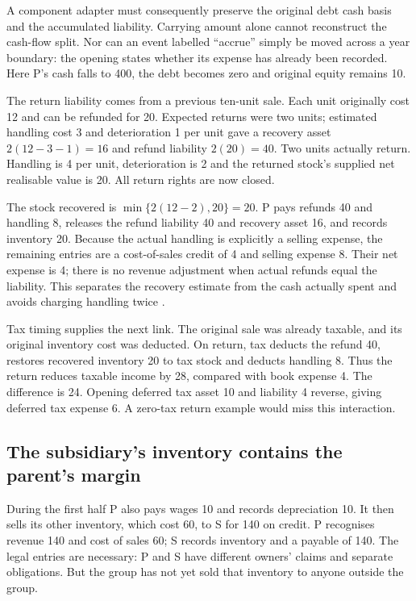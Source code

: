 A component adapter must consequently preserve the original debt cash basis
and the accumulated liability. Carrying amount alone cannot reconstruct the
cash-flow split. Nor can an event labelled ``accrue'' simply be moved across a
year boundary: the opening states whether its expense has already been recorded.
Here P's cash falls to 400, the debt becomes zero and original equity remains 10.

The return liability comes from a previous ten-unit sale. Each unit originally
cost 12 and can be refunded for 20. Expected returns were two units; estimated
handling cost 3 and deterioration 1 per unit gave a recovery asset
\(2(12-3-1)=16\) and refund liability \(2(20)=40\). Two units actually return.
Handling is 4 per unit, deterioration is 2 and the returned stock's supplied
net realisable value is 20. All return rights are now closed.

The stock recovered is \(\min\{2(12-2),20\}=20\). P pays refunds 40 and
handling 8, releases the refund liability 40 and recovery asset 16, and records
inventory 20. Because the actual handling is explicitly a selling expense,
the remaining entries are a cost-of-sales credit of 4 and selling expense 8.
Their net expense is 4; there is no revenue adjustment when actual refunds equal
the liability. This separates the recovery estimate from the cash actually
spent and avoids charging handling twice
\citep[IFRS~15.B21--B27; IAS~2.16]{eu20231803}.

Tax timing supplies the next link. The original sale was already taxable, and
its original inventory cost was deducted. On return, tax deducts the refund 40,
restores recovered inventory 20 to tax stock and deducts handling 8. Thus the
return reduces taxable income by 28, compared with book expense 4. The
difference is 24. Opening deferred tax asset 10 and liability 4 reverse, giving
deferred tax expense 6. A zero-tax return example would miss this interaction.

\subsection{The subsidiary's inventory contains the parent's margin}

During the first half P also pays wages 10 and records depreciation 10. It then
sells its other inventory, which cost 60, to S for 140 on credit. P recognises
revenue 140 and cost of sales 60; S records inventory and a payable of 140.
The legal entries are necessary: P and S have different owners' claims and
separate obligations. But the group has not yet sold that inventory to anyone
outside the group.

